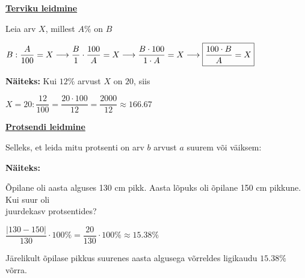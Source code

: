\begin{center}
{{{\begin{flushleft}
\vspace{5mm}
\hspace{5mm}
\textbf{\underline{Terviku leidmine}}

\vspace{2mm}
\hspace{5mm}
Leia arv $X$, millest $A\%$ on $B$

\vspace{2mm}
\hspace{5mm}
$B:\dfrac{A}{100} = X \longrightarrow \dfrac{B}{1}\cdot \dfrac{100}{A} = X \longrightarrow \dfrac{B \cdot 100}{1\cdot A} = X \longrightarrow \fbox{$\dfrac{100 \cdot B}{A} = X$}$

\vspace{5mm}
\hspace{5mm}
\textbf{Näiteks:} Kui $12\%$ arvust $X$ on $20$, siis

\vspace{5mm}
\hspace{5mm}
$X= 20:\dfrac{12}{100}=\dfrac{20 \cdot 100}{12}= \dfrac{2000}{12}\approx 166.67$

\vspace{5mm}
\hspace{5mm}
\textbf{\underline{Protsendi leidmine}}

\vspace{2mm}
\hspace{5mm}
Selleks, et leida mitu protsenti on arv $b$ arvust $a$ suurem või väiksem: 

\vspace{2mm}
\hspace{5mm}
\textbf{Näiteks:}

\vspace{2mm}
\hspace{5mm}
Õpilane oli aasta alguses 130 cm pikk. Aasta lõpuks oli õpilane 150 cm pikkune. Kui suur oli\\ \hspace{5mm} juurdekasv protsentides?

\vspace{2mm}
\hspace{5mm}
$\dfrac{|130-150|}{130} \cdot 100\% =\dfrac{20}{130}\cdot 100\% \approx 15.38\% $

\vspace{2mm}
\hspace{5mm}
Järelikult õpilase pikkus suurenes aasta algusega võrreldes ligikaudu $15.38\%$ võrra.

\end{flushleft}
}}}
\end{center}

